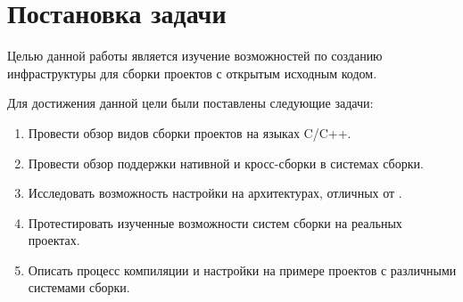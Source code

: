 
\section{Постановка задачи}
\label{sec:task}

Целью данной работы является изучение возможностей по созданию инфраструктуры для сборки проектов с открытым исходным кодом.

Для достижения данной цели были поставлены следующие задачи:
\begin{enumerate}
	\item Провести обзор видов сборки проектов на языках \textsc{C}/\textsc{C++}.
	\item Провести обзор поддержки нативной и кросс-сборки в системах сборки.
	\item Исследовать возможность настройки \ci{} на архитектурах, отличных от \amd{}.
	\item Протестировать изученные возможности систем сборки на реальных проектах.
	\item Описать процесс компиляции и настройки \ci{} на примере проектов с различными системами сборки.
\end{enumerate}

